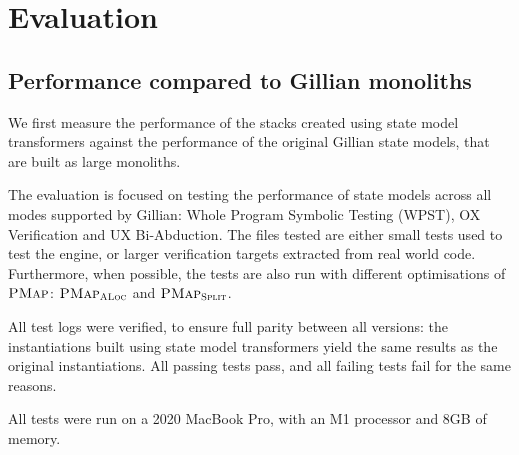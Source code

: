 \chapter{Evaluation}

\section{Performance compared to Gillian monoliths}

We first measure the performance of the stacks created using state model transformers against the performance of the original Gillian state models, that are built as large monoliths.

The evaluation is focused on testing the performance of state models across all modes supported by Gillian: Whole Program Symbolic Testing (WPST), OX Verification and UX Bi-Abduction. The files tested are either small tests used to test the engine, or larger verification targets extracted from real world code. Furthermore, when possible, the tests are also run with different optimisations of $\textsc{PMap}$: $\textsc{PMap}_{\textsc{ALoc}}$ and $\textsc{PMap}_{\textsc{Split}}$.

All test logs were verified, to ensure full parity between all versions: the instantiations built using state model transformers yield the same results as the original instantiations. All passing tests pass, and all failing tests fail for the same reasons.

All tests were run on a 2020 MacBook Pro, with an M1 processor and 8GB of memory.

